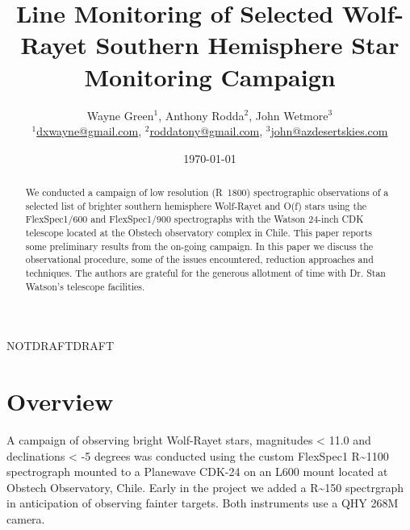 \documentclass[letter,11pt,oneside]{article}
\def\documentisdraft{NOTDRAFT}
\def\drafttest{DRAFT}
\begin{document}


\title{Line Monitoring of Selected Wolf-Rayet Southern Hemisphere Star Monitoring Campaign}
\author{Wayne Green$^{1}$, Anthony Rodda$^{2}$, John Wetmore$^{3}$\\
{\small $^{1}$\url{dxwayne@gmail.com},  $^{2}$\url{roddatony@gmail.com}, $^{3}$\url{john@azdesertskies.com} }}
\date{\today}
\maketitle

\begin{abstract}

We conducted a campaign of low resolution (R~1800) spectrographic
observations of a selected list of brighter southern hemisphere
Wolf-Rayet and O(f) stars using the FlexSpec1/600 and FlexSpec1/900
spectrographs with the Watson 24-inch CDK telescope located at the
Obstech observatory complex in Chile. This paper reports some
preliminary results from the on-going campaign. In this paper we
discuss the observational procedure, some of the issues encountered,
reduction approaches and techniques. The authors are grateful for the
generous allotment of time with Dr. Stan Watson's telescope
facilities.

\end{abstract}

 


\setcounter{section}{0}

\ifx\documentisdraft\drafttest
\linenumbers    %
\fi

\section{Overview}

A campaign of observing bright Wolf-Rayet stars, magnitudes < 11.0
and declinations < -5 degrees was conducted using the custom FlexSpec1
R\textasciitilde 1100 spectrograph mounted to a Planewave CDK-24 on
an L600 mount located at Obstech Observatory, Chile. Early in the
project we added a R\textasciitilde 150 spectrgraph in anticipation
of observing fainter targets. Both instruments use a QHY 268M camera.
\end{document}

